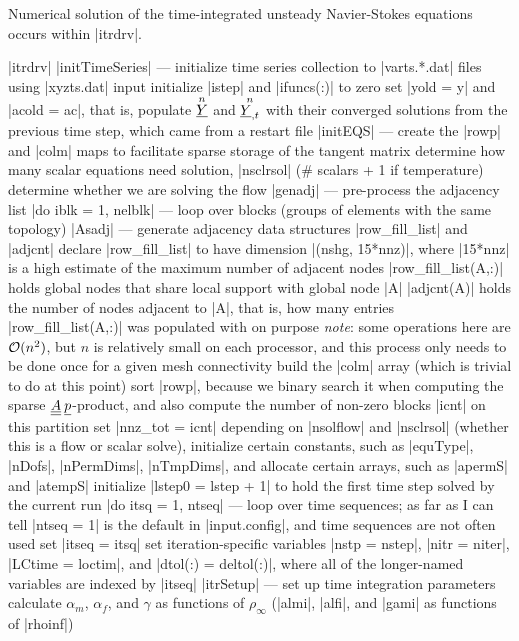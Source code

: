 \documentclass[11pt]{article}
\begin{document}
Numerical solution of the time-integrated unsteady Navier-Stokes equations occurs within |itrdrv|.
\begin{outline}[deep]
\1 |itrdrv|
	\2 |initTimeSeries| --- initialize time series collection to |varts.*.dat| files using |xyzts.dat| input
	\2 initialize |istep| and |ifuncs(:)| to zero
	\2 set |yold = y| and |acold = ac|, that is, populate $\oset{n}{\ul{Y}}$ and $\oset{n}{\ul{Y}_{,t}}$ with their converged solutions from the previous time step, which came from a restart file
	\2 |initEQS| --- create the |rowp| and |colm| maps to facilitate sparse storage of the tangent matrix
		\3 determine how many scalar equations need solution, |nsclrsol| (\# scalars + 1 if temperature)
		\3 determine whether we are solving the flow
		\3 |genadj| --- pre-process the adjacency list
			\4 |do iblk = 1, nelblk| --- loop over blocks (groups of elements with the same topology)
				\5 |Asadj| --- generate adjacency data structures |row_fill_list| and |adjcnt|
					\6 declare |row_fill_list| to have dimension |(nshg, 15*nnz)|, where |15*nnz| is a high estimate of the maximum number of adjacent nodes
					\6 |row_fill_list(A,:)| holds global nodes that share local support with global node |A|
					\6 |adjcnt(A)| holds the number of nodes adjacent to |A|, that is, how many entries |row_fill_list(A,:)| was populated with on purpose
					\6 \emph{note}: some operations here are $\mathcal{O}(n^2)$, but $n$ is relatively small on each processor, and this process only needs to be done once for a given mesh connectivity
			\4 build the |colm| array (which is trivial to do at this point)
			\4 sort |rowp|, because we binary search it when computing the sparse $\underline{\underline{A}}\:\underline{p}$-product, and also compute the number of non-zero blocks |icnt| on this partition
		\3 set |nnz_tot = icnt|
		\3 depending on |nsolflow| and |nsclrsol| (whether this is a flow or scalar solve), initialize certain constants, such as |equType|, |nDofs|, |nPermDims|, |nTmpDims|, and allocate certain arrays, such as |apermS| and |atempS|
	\2 initialize |lstep0 = lstep + 1| to hold the first time step solved by the current run
	\2 |do itsq = 1, ntseq| --- loop over time sequences; as far as I can tell |ntseq = 1| is the default in |input.config|, and time sequences are not often used
		\3 set |itseq = itsq|
		\3 set iteration-specific variables |nstp = nstep|, |nitr = niter|, |LCtime = loctim|, and |dtol(:) = deltol(:)|, where all of the longer-named variables are indexed by |itseq|
		\3 |itrSetup| --- set up time integration parameters
			\4 calculate $\alpha_m$, $\alpha_f$, and $\gamma$ as functions of $\rho_\infty$ (|almi|, |alfi|, and |gami| as functions of |rhoinf|)

\end{outline}
\end{document}
